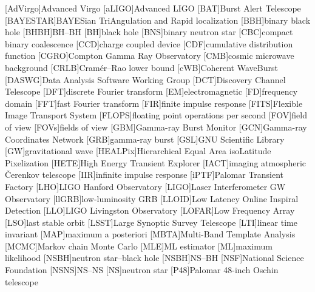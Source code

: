 \begin{acronym}
[AdVirgo]{Advanced Virgo}
[aLIGO]{Advanced \acs{LIGO}}
[BAT]{Burst Alert Telescope}
[BAYESTAR]{BAYESian TriAngulation and Rapid localization}
[BBH]{binary black hole}
[BHBH]{\acl{BH}\nobreakdashes--\acl{BH}}
[BH]{black hole}
[BNS]{binary neutron star}
[CBC]{compact binary coalescence}
[CCD]{charge coupled device}
[CDF]{cumulative distribution function}
[CGRO]{Compton Gamma Ray Observatory}
[CMB]{cosmic microwave background}
[CRLB]{Cram\'{e}r\nobreakdashes--Rao lower bound}
[cWB]{Coherent WaveBurst}
[DASWG]{Data Analysis Software Working Group}
[DCT]{Discovery Channel Telescope}
[DFT]{discrete Fourier transform}
[EM]{electromagnetic}
[FD]{frequency domain}
[FFT]{fast Fourier transform}
[FIR]{finite impulse response}
[FITS]{Flexible Image Transport System}
[FLOPS]{floating point operations per second}
[FOV]{field of view}
[FOVs]{fields of view}
[GBM]{Gamma-ray Burst Monitor}
[GCN]{Gamma-ray Coordinates Network}
[GRB]{gamma-ray burst}
[GSL]{GNU Scientific Library}
[GW]{gravitational wave}
[HEALPix]{Hierarchical Equal Area isoLatitude Pixelization}
[HETE]{High Energy Transient Explorer}
[IACT]{imaging atmospheric \v{C}erenkov telescope}
[IIR]{infinite impulse response}
[iPTF]{Palomar Transient Factory}
[LHO]{\ac{LIGO} Hanford Observatory}
[LIGO]{Laser Interferometer \acs{GW} Observatory}
[llGRB]{low\nobreakdashes-luminosity \ac{GRB}}
[LLOID]{Low Latency Online Inspiral Detection}
[LLO]{\ac{LIGO} Livingston Observatory}
[LOFAR]{Low Frequency Array}
[LSO]{last stable orbit}
[LSST]{Large Synoptic Survey Telescope}
[LTI]{linear time invariant}
[MAP]{maximum a posteriori}
[MBTA]{Multi-Band Template Analysis}
[MCMC]{Markov chain Monte Carlo}
[MLE]{\ac{ML} estimator}
[ML]{maximum likelihood}
[NSBH]{neutron star\nobreakdashes--black hole}
[NSBH]{\acl{NS}\nobreakdashes--\acl{BH}}
[NSF]{National Science Foundation}
[NSNS]{\acl{NS}\nobreakdashes--\acl{NS}}
[NS]{neutron star}
[P48]{Palomar 48\nobreakdashes-inch Oschin telescope}

\end{acronym}
